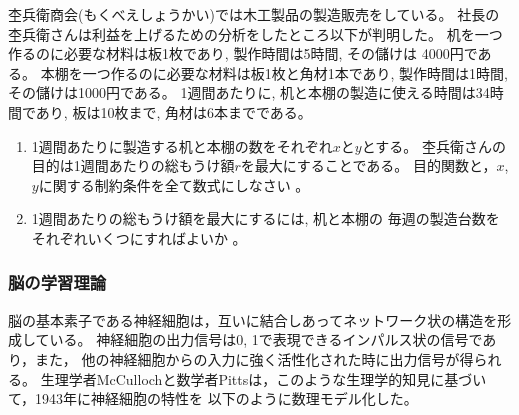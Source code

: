 \documentclass[twocolumn,11pt]{jarticle}
\begin{document}
\nquestion
杢兵衛商会(もくべえしょうかい)では木工製品の製造販売をしている。
社長の杢兵衛さんは利益を上げるための分析をしたところ以下が判明した。
机を一つ作るのに必要な材料は板1枚であり, 製作時間は5時間, その儲けは
4000円である。
本棚を一つ作るのに必要な材料は板1枚と角材1本であり, 製作時間は1時間, 
その儲けは1000円である。
1週間あたりに, 机と本棚の製造に使える時間は34時間であり, 板は10枚まで, 
角材は6本までである。
\begin{enumerate}
\item 1週間あたりに製造する机と本棚の数をそれぞれ$x$と$y$とする。
杢兵衛さんの目的は1週間あたりの総もうけ額$r$を最大にすることである。
目的関数と，$x$, $y$に関する制約条件を全て数式にしなさい
。
\item 1週間あたりの総もうけ額を最大にするには, 机と本棚の
  毎週の製造台数をそれぞれいくつにすればよいか
  。
\end{enumerate}

\subsubsection{脳の学習理論}

脳の基本素子である神経細胞は，互いに結合しあってネットワーク状の構造を形成している。
神経細胞の出力信号は0, 1で表現できるインパルス状の信号であり，また，
他の神経細胞からの入力に強く活性化された時に出力信号が得られる。
生理学者McCullochと数学者Pittsは，このような生理学的知見に基づいて，1943年に神経細胞の特性を
以下のように数理モデル化した。
\end{document}
